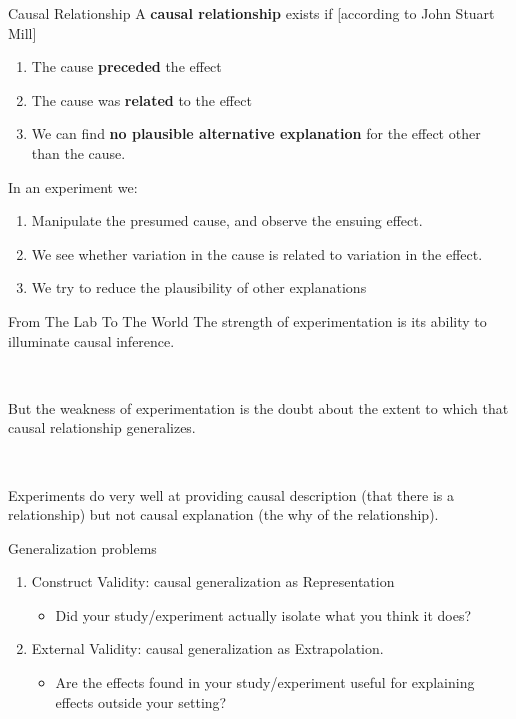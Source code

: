 \documentclass{beamer}
\begin{document}
\begin{frame}{Causal Relationship}
A \textbf{causal relationship} exists if [according to John Stuart Mill]
\begin{enumerate}
\item The cause \textbf{preceded} the effect
\item The cause was \textbf{related} to the effect
\item We can find \textbf{no plausible alternative explanation} for the effect other than the
cause.
\end{enumerate}
\pause
In an experiment we:
\begin{enumerate}
\item Manipulate the presumed cause, and observe the ensuing effect.\pause
\item We see whether variation in the cause is related to variation in the effect.\pause
\item We try to reduce the plausibility of other explanations
\end{enumerate}

\end{frame}

\begin{frame}{From The Lab To The World}
The strength of experimentation is its ability to illuminate causal
inference.
\pause

\

But the weakness of experimentation is the doubt about the extent to which that
causal relationship generalizes.\pause

\

Experiments do very well at providing causal description (that there is a relationship) but not causal explanation (the why of the relationship).
\end{frame}

\begin{frame}{Generalization problems}
\begin{enumerate}
\item Construct Validity: causal generalization as Representation
    \begin{itemize}
        \item Did your study/experiment actually isolate what you think it does?
    \end{itemize}
\item External Validity: causal generalization as Extrapolation.
    \begin{itemize}
        \item Are the effects found in your study/experiment useful for explaining effects outside your setting?
    \end{itemize}
\end{enumerate}
\end{frame}
\end{document}
